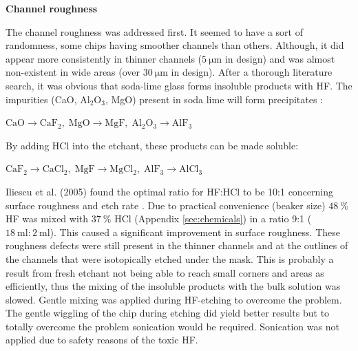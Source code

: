 \documentclass[final]{jyflluk}
\begin{document}
\begin{flushleft}\textbf{Channel roughness} \end{flushleft}
The channel roughness was addressed first. It seemed to have a sort of randomness, some chips having smoother channels than others. Although, it did appear more consistently in thinner channels ($\SI{5}{\micro \metre}$ in design) and was almost non-existent in wide areas (over $\SI{30}{\micro \metre}$ in design). After a thorough literature search, it was obvious that soda-lime glass forms insoluble products with HF. The impurities (CaO, $\mathrm{Al_2 O_3}$, MgO) present in soda lime will form precipitates \cite{lin2001fast,iliescu2005characterization}:
\vaali
\centerline{$\mathrm{ CaO \rightarrow CaF_2,\; MgO \rightarrow MgF, \; Al_2 O_3 \rightarrow AlF_3}$}
\vaali
\noindent By adding HCl into the etchant, these products can be made soluble:
\vaali
\centerline{$\mathrm{CaF_2 \rightarrow CaCl_2, \; MgF \rightarrow MgCl_2, \; AlF_3 \rightarrow AlCl_3}$}
\vaali
\noindent Iliescu et al. (2005) found the optimal ratio for HF:HCl to be 10:1 concerning surface roughness and etch rate \cite{iliescu2005characterization}. Due to practical convenience (beaker size) $\SI{48}{\percent}$ HF was mixed with $\SI{37}{\percent}$ HCl (Appendix \ref{sec:chemicals}) in a ratio 9:1 ($\SI{18}{\milli \litre}:\SI{2}{\milli \litre}$). This caused a significant improvement in surface roughness. These roughness defects were still present in the thinner channels and at the outlines of the channels that were isotopically etched under the mask. This is probably a result from fresh etchant not being able to reach small corners and areas as efficiently, thus the mixing of the insoluble products with the bulk solution was slowed. Gentle mixing was applied during HF-etching to overcome the problem. The gentle wiggling of the chip during etching did yield better results but to totally overcome the problem sonication would be required. Sonication was not applied due to safety reasons of the toxic HF.
\end{document}
